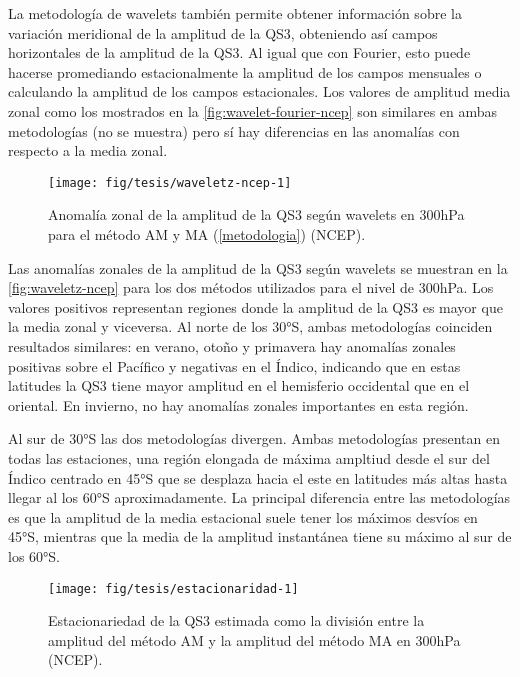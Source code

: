 \documentclass[spanish,a4paper,12pt]{book}
\begin{document}
La metodología de wavelets también permite obtener información sobre la
variación meridional de la amplitud de la QS3, obteniendo así campos
horizontales de la amplitud de la QS3. Al igual que con Fourier, esto
puede hacerse promediando estacionalmente la amplitud de los campos
mensuales o calculando la amplitud de los campos estacionales. Los
valores de amplitud media zonal como los mostrados en la
\autoref{fig:wavelet-fourier-ncep} son similares en ambas metodologías
(no se muestra) pero sí hay diferencias en las anomalías con respecto a
la media zonal.

\begin{figure}

{\centering \texttt{[image: fig/tesis/waveletz-ncep-1]} 

}

\caption{Anomalía zonal de la amplitud de la QS3 según wavelets en 300hPa para el método AM y MA (\autoref{metodologia}) (NCEP).}\label{fig:waveletz-ncep}
\end{figure}

Las anomalías zonales de la amplitud de la QS3 según wavelets se
muestran en la \autoref{fig:waveletz-ncep} para los dos métodos
utilizados para el nivel de 300hPa. Los valores positivos representan
regiones donde la amplitud de la QS3 es mayor que la media zonal y
viceversa. Al norte de los 30°S, ambas metodologías coinciden resultados
similares: en verano, otoño y primavera hay anomalías zonales positivas
sobre el Pacífico y negativas en el Índico, indicando que en estas
latitudes la QS3 tiene mayor amplitud en el hemisferio occidental que en
el oriental. En invierno, no hay anomalías zonales importantes en esta
región.

Al sur de 30°S las dos metodologías divergen. Ambas metodologías
presentan en todas las estaciones, una región elongada de máxima
ampltiud desde el sur del Índico centrado en 45°S que se desplaza hacia
el este en latitudes más altas hasta llegar al los 60°S aproximadamente.
La principal diferencia entre las metodologías es que la amplitud de la
media estacional suele tener los máximos desvíos en 45°S, mientras que
la media de la amplitud instantánea tiene su máximo al sur de los 60°S.

\begin{figure*}
\texttt{[image: fig/tesis/estacionaridad-1]} \caption{Estacionariedad de la QS3 estimada como la división entre la amplitud del método AM y la amplitud del método MA en 300hPa (NCEP).}\label{fig:estacionaridad}
\end{figure*}
\end{document}
